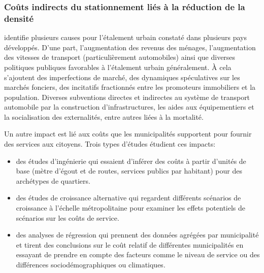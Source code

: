         \subsubsection{Coûts indirects du stationnement liés à la réduction de la densité}
        \textcite{ewing_characteristics_2008} identifie plusieurs causes pour l'étalement urbain constaté dans plusieurs pays développés. D'une part, l'augmentation des revenus des ménages, l'augmentation des vitesses de transport (particulièrement automobiles) ainsi que diverses politiques publiques favorables à l'étalement urbain généralement. À cela s'ajoutent des imperfections de marché, des dynamiques spéculatives sur les marchés fonciers, des incitatifs fractionnés entre les promoteurs immobiliers et la population\parencite{blais_perverse_2024}. Diverses subventions directes et indirectes au système de transport automobile par la construction d'infrastructures, les aides aux équipementiers et la socialisation des externalités, entre autres liées à la mortalité\parencite{mattioli_political_2020,miner_car_2024}. \par
        Un autre impact est lié aux coûts que les municipalités supportent pour fournir des services aux citoyens. Trois types d'études étudient ces impacts:
        \begin{itemize}
            \item des études d'ingénierie qui essaient d'inférer des coûts à partir d'unités de base (mètre d'égout et de routes, services publics par habitant) pour des archétypes de quartiers.
            \item des études de croissance alternative qui regardent différents scénarios de croissance à l'échelle métropolitaine pour examiner les effets potentiels de scénarios sur les coûts de service.
            \item des analyses de régression qui prennent des données agrégées par municipalité et tirent des conclusions sur le coût relatif de différentes municipalités en essayant de prendre en compte des facteurs comme le niveau de service ou des différences sociodémographiques ou climatiques.
        \end{itemize}
